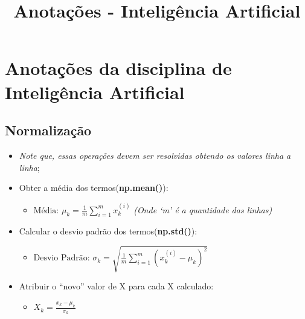 \documentclass[11pt]{article}
\title{Anotações - Inteligência Artificial}
\providecommand{\tightlist}{%
      \setlength{\itemsep}{0pt}\setlength{\parskip}{0pt}}
\begin{document}
    
    
    \maketitle
    
    

    
    \hypertarget{anotauxe7uxf5es-da-disciplina-de-inteliguxeancia-artificial}{%
\section{\texorpdfstring{\textbf{Anotações da disciplina de Inteligência
Artificial}}{Anotações da disciplina de Inteligência Artificial}}\label{anotauxe7uxf5es-da-disciplina-de-inteliguxeancia-artificial}}

    \hypertarget{normalizauxe7uxe3o}{%
\subsection{\texorpdfstring{\textbf{Normalização}}{Normalização}}\label{normalizauxe7uxe3o}}

\begin{itemize}
\tightlist
\item
  \emph{Note que, essas operações devem ser resolvidas obtendo os
  valores linha a linha};
\item
  Obter a média dos termos(\textbf{np.mean()}):

  \begin{itemize}
  \tightlist
  \item
    \(\text{Média: }\mu_k=\frac{1}{m}\sum\limits_{i=1}^{m}x_k^{(i)}\)
    \emph{(Onde `m' é a quantidade das linhas)}
  \end{itemize}
\item
  Calcular o desvio padrão dos termos(\textbf{np.std()}):

  \begin{itemize}
  \tightlist
  \item
    \(\text{Desvio Padrão: }\sigma_k=\sqrt{\frac{1}{m}\sum\limits_{i=1}^{m}(x_k^{(i)}-\mu_k)^2}\)
  \end{itemize}
\item
  Atribuir o ``novo'' valor de X para cada X calculado:

  \begin{itemize}
  \tightlist
  \item
    \(X_k=\frac{x_k-\mu_k}{\sigma_k}\)
  \end{itemize}
\end{itemize}
\end{document}
